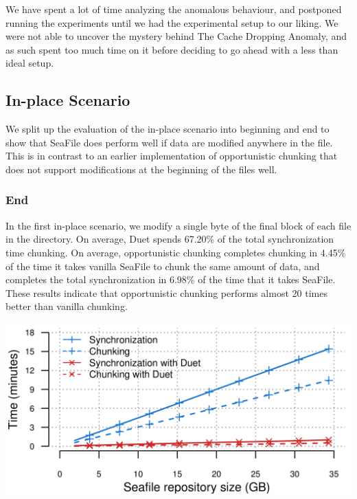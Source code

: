 \documentclass[table]{article}
\newenvironment{Figure}
  {\par\medskip\noindent\minipage{\linewidth}}
  {\endminipage\par\medskip}
\begin{document}
\begin{multicols}{2}
\begin{itemize}
            We have spent a lot of time analyzing the anomalous behaviour, and postponed running the experiments until we had the experimental setup to our liking. We were not able to uncover the mystery behind The Cache Dropping Anomaly, and as such spent too much time on it before deciding to go ahead with a less than ideal setup.
\end{itemize}
\subsection{In-place Scenario}

We split up the evaluation of the in-place scenario into beginning and end to show that SeaFile does perform well if data are modified anywhere in the file. This is in contrast to an earlier implementation of opportunistic chunking that does not support modifications at the beginning of the files well.

\subsubsection{End}

In the first in-place scenario, we modify a single byte of the final block of each file in the directory. On average, Duet spends 67.20\% of the total synchronization time chunking. On average, opportunistic chunking completes chunking in 4.45\% of the time it takes vanilla SeaFile to chunk the same amount of data, and completes the total synchronization in 6.98\% of the time that it takes SeaFile. These results indicate that opportunistic chunking performs almost 20 times better than vanilla chunking.\\

\begin{Figure}
 \centering
 \includegraphics[width=\linewidth]{duet_in_place_end.png}
 \label{fig:SeaFileInPlaceEnd}
\end{Figure}


\end{multicols}
\end{document}
